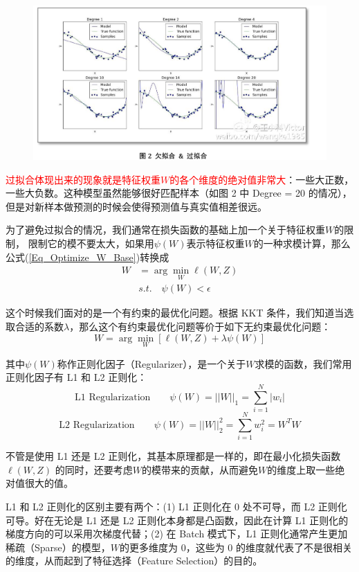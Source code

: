 \documentclass[12pt]{article}
\begin{document}
\begin{figure}[H]
    \centering
    \includegraphics[width=.8\textwidth]{fig/OnlineOptimization-LearningDegree.png}
\end{figure}

\textcolor{red}{过拟合体现出来的现象就是特征权重$W$的各个维度的绝对值非常大}：一些大正数，一些大负数。这种模型虽然能够很好匹配样本（如图 2 中 Degree = 20 的情况），但是对新样本做预测的时候会使得预测值与真实值相差很远。

为了避免过拟合的情况，我们通常在损失函数的基础上加一个关于特征权重$W$的限制， 限制它的模不要太大，如果用$\psi(W)$表示特征权重$W$的一种求模计算，那么公式(\ref{Eq_Optimize_W_Base})转换成
\begin{align*}
W &= \arg\min_W \ell(W,Z) \\
& s.t. \quad \psi(W)  < \epsilon
\end{align*}

这个时候我们面对的是一个有约束的最优化问题。根据 KKT 条件，我们知道当选取合适的系数$\lambda$，那么这个有约束最优化问题等价于如下无约束最优化问题：
$$
W = \arg\min_W [\ell(W,Z) + \lambda\psi(W)]
$$

其中$\psi(W)$称作正则化因子（Regularizer），是一个关于$W$求模的函数，我们常用正则化因子有 L1 和 L2 正则化：
$$
\text{L1 Regularization}\qquad \psi(W) = ||W||_1 = \sum_{i=1}^N|w_i|
$$
$$
\text{L2 Regularization}\qquad \psi(W) = ||W||_2^2 = \sum_{i=1}^Nw_i^2 = W^TW
$$

不管是使用 L1 还是 L2 正则化，其基本原理都是一样的，即在最小化损失函数 $\ell(W,Z)$ 的同时，还要考虑$W$的模带来的贡献，从而避免$W$的维度上取一些绝对值很大的值。

L1 和 L2 正则化的区别主要有两个：(1) L1 正则化在 0 处不可导，而 L2 正则化可导。好在无论是 L1 还是 L2 正则化本身都是凸函数，因此在计算 L1 正则化的梯度方向的可以采用次梯度代替；(2) 在 Batch 模式下，L1 正则化通常产生更加稀疏（Sparse）的模型，$W$的更多维度为 0，这些为 0 的维度就代表了不是很相关的维度，从而起到了特征选择（Feature Selection）的目的。
\end{document}

